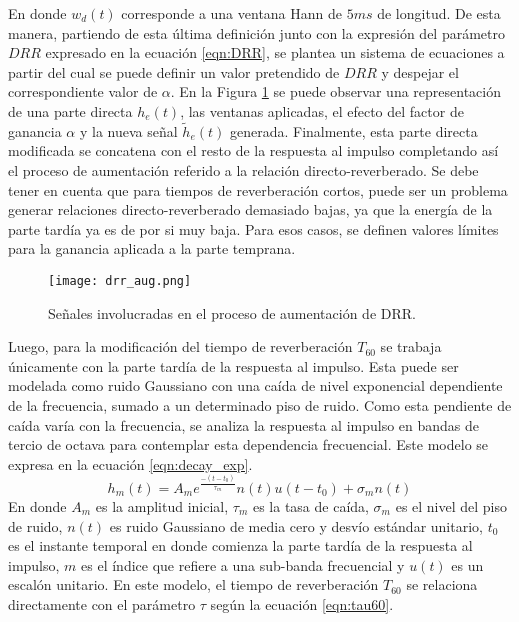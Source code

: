 En donde $w_{d}(t)$ corresponde a una ventana Hann de $5 ms$ de longitud. De esta manera, partiendo de esta última definición junto con la expresión del parámetro $DRR$ expresado en la ecuación \ref{eqn:DRR}, se plantea un sistema de ecuaciones a partir del cual se puede definir un valor pretendido de $DRR$ y despejar el correspondiente valor de $\alpha$. En la Figura \ref{fig:drr_aug} se puede observar una representación de una parte directa $h_{e}(t)$, las ventanas aplicadas, el efecto del factor de ganancia $\alpha$ y la nueva señal $\tilde{h}_{e}(t)$ generada. Finalmente, esta parte directa modificada se concatena con el resto de la respuesta al impulso completando así el proceso de aumentación referido a la relación directo-reverberado. Se debe tener en cuenta que para tiempos de reverberación cortos, puede ser un problema generar relaciones directo-reverberado demasiado bajas, ya que la energía de la parte tardía ya es de por si muy baja. Para esos casos, se definen valores límites para la ganancia aplicada a la parte temprana.

\begin{figure}[h]
	\centering{}
	\texttt{[image: drr\_aug.png]}
	\caption{Señales involucradas en el proceso de aumentación de DRR.}
	\label{fig:drr_aug}
\end{figure}

Luego, para la modificación del tiempo de reverberación $T_{60}$ se trabaja únicamente con la parte tardía de la respuesta al impulso. Esta puede ser modelada como ruido Gaussiano con una caída de nivel exponencial dependiente de la frecuencia, sumado a un determinado piso de ruido. Como esta pendiente de caída varía con la frecuencia, se analiza la respuesta al impulso en bandas de tercio de octava para contemplar esta dependencia frecuencial. Este modelo se expresa en la ecuación \ref{eqn:decay_exp}. 
\begin{equation}
\label{eqn:decay_exp}
	h_{m}(t) = A_{m} e^{\frac{-(t-t_{0})}{\tau_{m}}}n(t)u(t-t_{0})+\sigma_{m}n(t)
\end{equation} 
En donde $A_{m}$ es la amplitud inicial, $\tau_{m}$ es la tasa de caída, $\sigma_{m}$ es el nivel del piso de ruido, $n(t)$ es ruido Gaussiano de media cero y desvío estándar unitario, $t_{0}$ es el instante temporal en donde comienza la parte tardía de la respuesta al impulso, $m$ es el índice que refiere a una sub-banda frecuencial y $u(t)$ es un escalón unitario. En este modelo, el tiempo de reverberación $T_{60}$ se relaciona directamente con el parámetro $\tau$ según la ecuación \ref{eqn:tau60}.

